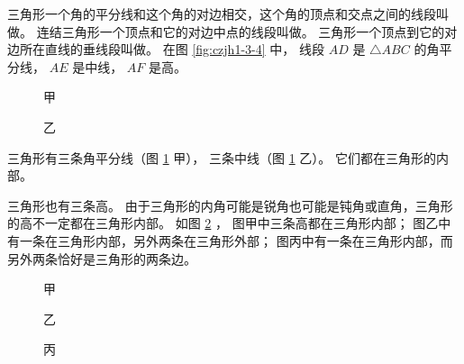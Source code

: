 三角形一个角的平分线和这个角的对边相交，这个角的顶点和交点之间的线段叫做。
连结三角形一个顶点和它的对边中点的线段叫做。
三角形一个顶点到它的对边所在直线的垂线段叫做。
在图 \ref{fig:czjh1-3-4} 中， 线段 $AD$ 是 $\triangle ABC$ 的角平分线， $AE$ 是中线， $AF$ 是高。

\begin{figure}[htbp]
    \centering
    \begin{minipage}[b]{7cm}
        \centering
        
        \caption*{甲}
    \end{minipage}
    \qquad
    \begin{minipage}[b]{7cm}
        \centering
        
        \caption*{乙}
    \end{minipage}
    \caption{}\label{fig:czjh1-3-5}
\end{figure}

三角形有三条角平分线（图 \ref{fig:czjh1-3-5} 甲）， 三条中线（图 \ref{fig:czjh1-3-5} 乙）。
它们都在三角形的内部。

三角形也有三条高。 由于三角形的内角可能是锐角也可能是钝角或直角，三角形的高不一定都在三角形内部。
如图 \ref{fig:czjh1-3-6} ， 图甲中三条高都在三角形内部；
图乙中有一条在三角形内部，另外两条在三角形外部；
图丙中有一条在三角形内部，而另外两条恰好是三角形的两条边。

\begin{figure}[htbp]
    \centering
    \begin{minipage}[b]{4.5cm}
        \centering
        
        \caption*{甲}
    \end{minipage}
    \qquad
    \begin{minipage}[b]{4cm}
        \centering
        
        \caption*{乙}
    \end{minipage}
    \begin{minipage}[b]{5.0cm}
        \centering
        
        \caption*{丙}
    \end{minipage}
    \caption{}\label{fig:czjh1-3-6}
\end{figure}


